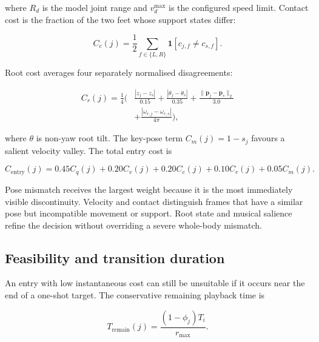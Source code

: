 where $R_d$ is the model joint range and $v_d^{\max}$ is the configured speed
limit. Contact cost is the fraction of the two feet whose support states differ:

\begin{equation}
    C_c(j)=\frac{1}{2}\sum_{f\in\{L,R\}}
       \mathbf{1}\!\left[c_{j,f}\neq c_{s,f}\right].
    \label{eq:ch5_contact_cost}
\end{equation}

Root cost averages four separately normalised disagreements:

\begin{equation}
\begin{split}
    C_r(j)=\frac{1}{4}\bigg(&
       \frac{|z_j-z_s|}{0.15}
       +\frac{|\theta_j-\theta_s|}{0.35}
       +\frac{\|\dot{\mathbf{p}}_j-
                    \dot{\mathbf{p}}_s\|_2}{3.0}\\
       &+\frac{|\omega_{r,j}-\omega_{r,s}|}{4\pi}\bigg),
\end{split}
    \label{eq:ch5_root_cost}
\end{equation}

where $\theta$ is non-yaw root tilt. The key-pose term
$C_m(j)=1-s_j$ favours a salient velocity valley. The total entry cost is

\begin{equation}
    C_{\mathrm{entry}}(j)
      =0.45C_q(j)+0.20C_v(j)+0.20C_c(j)
       +0.10C_r(j)+0.05C_m(j).
    \label{eq:ch5_entry_total}
\end{equation}

Pose mismatch receives the largest weight because it is the most immediately
visible discontinuity. Velocity and contact distinguish frames that have a
similar pose but incompatible movement or support. Root state and musical
salience refine the decision without overriding a severe whole-body mismatch.

\subsection{Feasibility and transition duration}
\label{subsec:ch5_entry_feasibility}

An entry with low instantaneous cost can still be unsuitable if it occurs near
the end of a one-shot target. The conservative remaining playback time is

\begin{equation}
    T_{\mathrm{remain}}(j)
      =\frac{(1-\phi_j)T_i}{r_{\max}}.
    \label{eq:ch5_remaining_time}
\end{equation}


